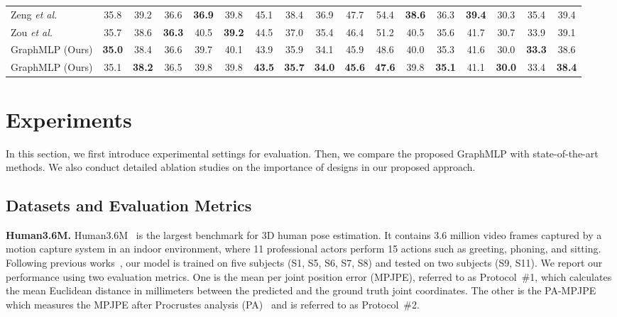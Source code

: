 \documentclass[lettersize,journal]{IEEEtran}
\begin{document}
\begin{table*}[tb]
{\begin{tabular}{@{}l|ccccccccccccccc|c@{}}
  Zeng \emph{et al.}~\cite{zeng2020srnet} &35.8 &39.2 &{36.6} &\textbf{36.9} &39.8 &45.1 &38.4 &36.9 &47.7 &54.4 &\textbf{38.6} &36.3 &\textbf{39.4} &30.3 &35.4 &39.4 \\

  Zou \emph{et al.}~\cite{zou2021modulated} &35.7 &38.6 &\textbf{36.3} &40.5 &\textbf{39.2} &44.5 &37.0 &35.4 &46.4 &51.2 &40.5 &35.6 &41.7 &30.7 &33.9 &39.1 \\
  
  \midrule
  GraphMLP (Ours) &\textbf{35.0} &{38.4} &{36.6} &{39.7} &{40.1} &{43.9} &{35.9} &{34.1} &{45.9} &{48.6} &{40.0} &{35.3} &{41.6} &{30.0} &\textbf{33.3} &{38.6} \\

  GraphMLP (Ours) &{35.1} &\textbf{38.2} &{36.5} &{39.8} &{39.8} &\textbf{43.5} &\textbf{35.7} &\textbf{34.0} &\textbf{45.6} &\textbf{47.6} &{39.8} &\textbf{35.1} &{41.1} &\textbf{30.0} &{33.4} &\textbf{38.4} \\

  \toprule
  \end{tabular}
  }
  \label{table:h36m}
\end{table*}

\section{Experiments}
In this section, we first introduce experimental settings for evaluation. 
Then, we compare the proposed GraphMLP with state-of-the-art methods. 
We also conduct detailed ablation studies on the importance of designs in our proposed approach. 

\subsection{Datasets and Evaluation Metrics}
\noindent \textbf{Human3.6M.} Human3.6M~\cite{ionescu2013human3} is the largest benchmark for 3D human pose estimation. 
It contains 3.6 million video frames captured by a motion capture system in an indoor environment, where 11 professional actors perform 15 actions such as greeting, phoning, and sitting. 
Following previous works~\cite{simplebaseline,xu2021graph,zeng2021learning}, our model is trained on five subjects (S1, S5, S6, S7, S8) and tested on two subjects (S9, S11). 
We report our performance using two evaluation metrics. 
One is the mean per joint position error (MPJPE), referred to as Protocol~\#1, which calculates the mean Euclidean distance in millimeters between the predicted and the ground truth joint coordinates. 
The other is the PA-MPJPE which measures the MPJPE after Procrustes analysis (PA)~\cite{gower1975generalized} and is referred to as Protocol~\#2. 
\end{document}
